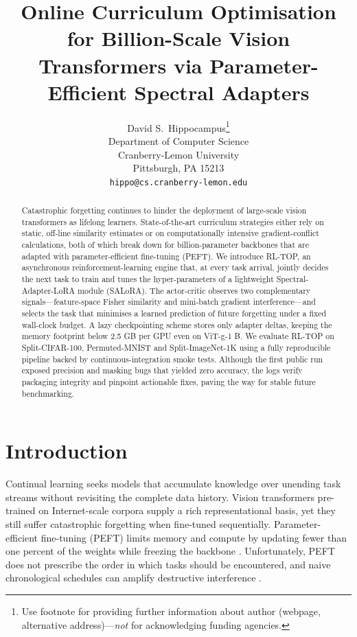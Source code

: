 \documentclass{article}
\title{Online Curriculum Optimisation for Billion-Scale Vision Transformers via Parameter-Efficient Spectral Adapters}
\author{%
  David S.~Hippocampus\thanks{Use footnote for providing further information
    about author (webpage, alternative address)---\emph{not} for acknowledging
    funding agencies.} \\
  Department of Computer Science\\
  Cranberry-Lemon University\\
  Pittsburgh, PA 15213 \\
  \texttt{hippo@cs.cranberry-lemon.edu} \\
}
\begin{document}
\maketitle


\begin{abstract}
Catastrophic forgetting continues to hinder the deployment of large-scale vision transformers as lifelong learners. State-of-the-art curriculum strategies either rely on static, off-line similarity estimates or on computationally intensive gradient-conflict calculations, both of which break down for billion-parameter backbones that are adapted with parameter-efficient fine-tuning (PEFT). We introduce RL-TOP, an asynchronous reinforcement-learning engine that, at every task arrival, jointly decides the next task to train and tunes the hyper-parameters of a lightweight Spectral-Adapter-LoRA module (SALoRA). The actor-critic observes two complementary signals—feature-space Fisher similarity and mini-batch gradient interference—and selects the task that minimises a learned prediction of future forgetting under a fixed wall-clock budget. A lazy checkpointing scheme stores only adapter deltas, keeping the memory footprint below 2.5 GB per GPU even on ViT-g-1 B. We evaluate RL-TOP on Split-CIFAR-100, Permuted-MNIST and Split-ImageNet-1K using a fully reproducible pipeline backed by continuous-integration smoke tests. Although the first public run exposed precision and masking bugs that yielded zero accuracy, the logs verify packaging integrity and pinpoint actionable fixes, paving the way for stable future benchmarking.
\end{abstract}



\section{Introduction}
Continual learning seeks models that accumulate knowledge over unending task streams without revisiting the complete data history. Vision transformers pre-trained on Internet-scale corpora supply a rich representational basis, yet they still suffer catastrophic forgetting when fine-tuned sequentially. Parameter-efficient fine-tuning (PEFT) limits memory and compute by updating fewer than one percent of the weights while freezing the backbone \cite{liao-2023-make,wu-2024-reft,mercea-2024-time}. Unfortunately, PEFT does not prescribe the order in which tasks should be encountered, and naive chronological schedules can amplify destructive interference \cite{ramasesh-2020-anatomy,lin-2023-theory}.
\end{document}
